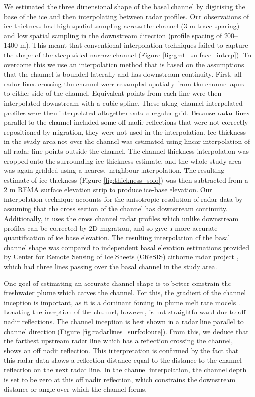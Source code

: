 We estimated the three dimensional shape of the basal channel by digitising the base of the ice and then interpolating between radar profiles. Our observations of ice thickness had high spatial sampling across the channel (3 m trace spacing) and low spatial sampling in the downstream direction (profile spacing of 200--1400 m). This meant that conventional interpolation techniques failed to capture the shape of the steep sided narrow channel (Figure \ref{fig:gmt_surface_interp}). To overcome this we use an interpolation method that is based on the assumptions that the channel is bounded laterally and has downstream continuity. First, all radar lines crossing  the channel were resampled spatially from the channel apex to either side of the channel. Equivalent points from each line were then interpolated downstream with a cubic spline. These along--channel interpolated  profiles were then interpolated altogether onto a regular grid.  Because radar lines parallel to the channel included some off-nadir reflections that were not correctly repositioned by migration, they were not used in the interpolation. Ice thickness in the study area not over the channel was estimated using linear interpolation of all radar line points outside the channel. The channel thickness interpolation was cropped onto the surrounding ice thickness estimate, and the whole study area was again gridded using a nearest--neighbour interpolation. The resulting estimate of ice thickness (Figure \ref{fig:thickness_solo}) was then subtracted from a 2 m REMA surface elevation strip to produce ice-base elevation.
Our interpolation technique accounts for the anisotropic resolution of radar data by assuming that the cross section of the channel has downstream continuity. Additionally, it uses the cross channel radar profiles which unlike downstream profiles can be corrected by 2D migration, and so give a more accurate quantification of ice base elevation. 
The resulting interpolation of the basal channel shape was compared to  independent basal elevation estimations provided by Center for Remote Sensing of Ice Sheets (CReSIS) airborne radar project \citep{arnold2020cresis}, which had three lines passing over the basal channel in the study area.  

One goal of estimating an accurate channel shape is to better constrain the freshwater plume which carves the channel. For this, the gradient of the channel inception is important, as it is a dominant forcing in plume melt rate models \citep{jenkins1991one}. Locating the inception of the channel, however, is not straightforward due to off nadir reflections. The channel inception is best shown in a radar line parallel to channel direction (Figure \ref{fig:radarlines_surfcoloure}). From this, we deduce that the farthest upstream radar line which has a reflection crossing the channel, shows an off nadir reflection. This interpretation is confirmed by the fact that this radar data shows a reflection distance equal to the distance to the channel reflection on the next radar line.  In the channel interpolation, the channel depth is set to be zero at this off nadir reflection, which constrains the downstream distance or angle over which the channel forms.



